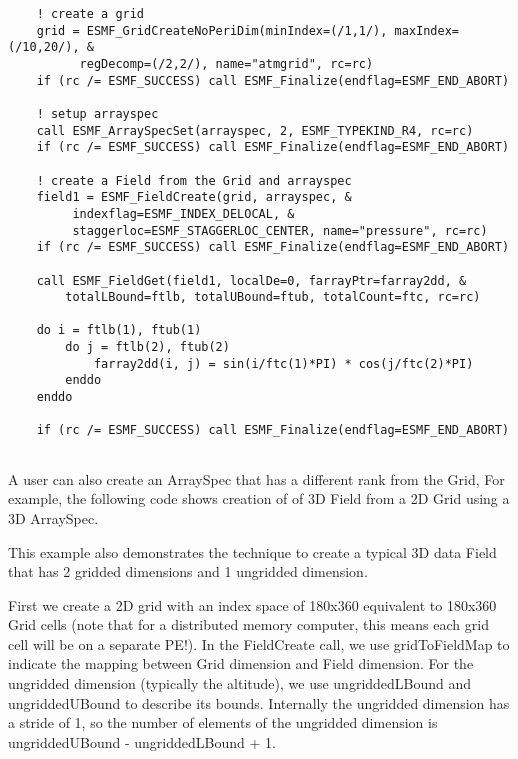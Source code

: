  \begin{verbatim}
    ! create a grid
    grid = ESMF_GridCreateNoPeriDim(minIndex=(/1,1/), maxIndex=(/10,20/), &
          regDecomp=(/2,2/), name="atmgrid", rc=rc)
    if (rc /= ESMF_SUCCESS) call ESMF_Finalize(endflag=ESMF_END_ABORT)

    ! setup arrayspec
    call ESMF_ArraySpecSet(arrayspec, 2, ESMF_TYPEKIND_R4, rc=rc)
    if (rc /= ESMF_SUCCESS) call ESMF_Finalize(endflag=ESMF_END_ABORT)

    ! create a Field from the Grid and arrayspec
    field1 = ESMF_FieldCreate(grid, arrayspec, &
         indexflag=ESMF_INDEX_DELOCAL, &
         staggerloc=ESMF_STAGGERLOC_CENTER, name="pressure", rc=rc)
    if (rc /= ESMF_SUCCESS) call ESMF_Finalize(endflag=ESMF_END_ABORT)

    call ESMF_FieldGet(field1, localDe=0, farrayPtr=farray2dd, &
        totalLBound=ftlb, totalUBound=ftub, totalCount=ftc, rc=rc)

    do i = ftlb(1), ftub(1)
        do j = ftlb(2), ftub(2)
            farray2dd(i, j) = sin(i/ftc(1)*PI) * cos(j/ftc(2)*PI)
        enddo
    enddo

    if (rc /= ESMF_SUCCESS) call ESMF_Finalize(endflag=ESMF_END_ABORT)
 
\end{verbatim}
 

     A user can also create an ArraySpec that has a different rank
     from the Grid, For example, the following code shows creation of
     of 3D Field from a 2D Grid using a 3D ArraySpec.
  
     This example also demonstrates the technique to create a typical
     3D data Field that has 2 gridded dimensions and 1 ungridded
     dimension.
  
     First we create a 2D grid with an index space of 180x360 equivalent to
     180x360 Grid cells (note that for a distributed memory computer, this
     means each
     grid cell will be on a separate PE!). In the FieldCreate call, we use gridToFieldMap
     to indicate the mapping between Grid dimension and Field dimension.
     For the ungridded dimension (typically the altitude), we use
     ungriddedLBound and ungriddedUBound to describe its bounds. Internally
     the ungridded dimension has a stride of 1, so the number of elements
     of the ungridded dimension is ungriddedUBound - ungriddedLBound + 1.
  
